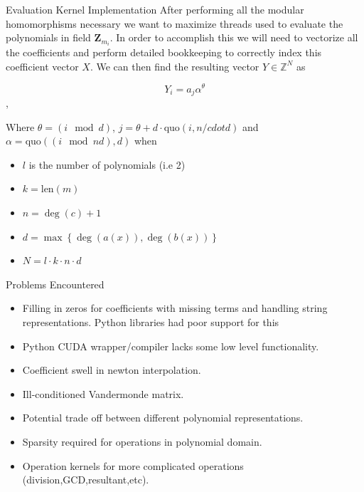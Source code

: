 \documentclass{beamer}
\begin{document}
		
	\begin{frame}{Evaluation Kernel Implementation}
		After performing all the modular homomorphisms necessary we want to maximize threads used to evaluate the polynomials in field $\mathbf{Z}_{m_i}$. In order to accomplish this we will need to vectorize all the coefficients and perform detailed bookkeeping to correctly index this coefficient vector $X$. We can then find the resulting vector $Y \in \mathbb{Z}^N$ as
		
		$$Y_i = a_{j}\alpha^\theta$$,
		
		Where $\theta = \left(i \mod d\right)$, $j = \theta  + d \cdot \text{quo}(i,n /cdot d)$ and 
		$\alpha = \text{quo}\left(\left(i\mod nd\right),d\right)$ when
		
		
		\begin{itemize}
		\item $l$ is the number of polynomials (i.e 2) \\
		\item $k = \text{len}(m)$  \\
		\item $n = \deg(c)+ 1$ \\
		\item $d= \max\left\{\deg( a(x)),\deg(b(x))\right\}$\\
		\item $N = l \cdot k \cdot n\cdot d$
		\end{itemize}
		
		
		
	\end{frame}
		
			 

	\begin{frame}{Problems Encountered}
		\begin{itemize}
			\item Filling in zeros for coefficients with missing terms and handling string representations. Python libraries had poor support for this
			\item Python CUDA wrapper/compiler lacks some low level functionality.
			\item Coefficient swell in newton interpolation.  \\
			\item Ill-conditioned Vandermonde matrix.
			\item Potential trade off between different polynomial representations.
			\item Sparsity required for operations in polynomial domain.
			\item Operation kernels for more complicated operations (division,GCD,resultant,etc).
		\end{itemize}
	\end{frame}
	
\end{document}
